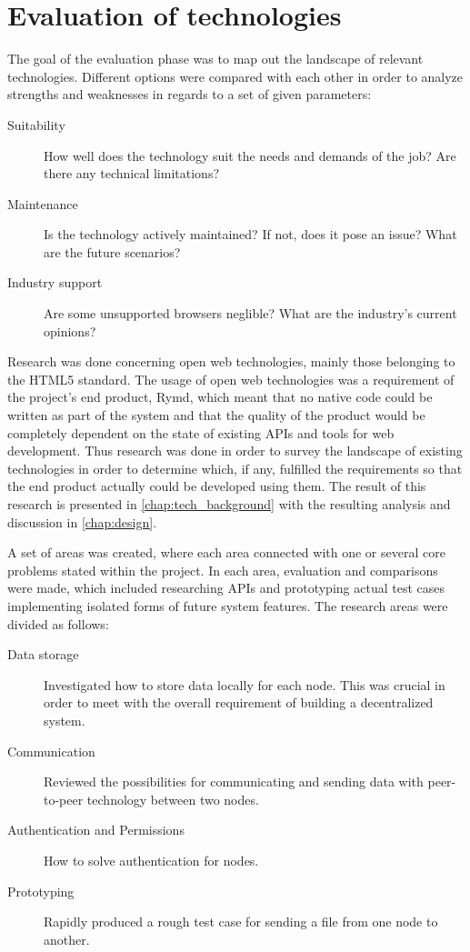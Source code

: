 \section{Evaluation of technologies}

The goal of the evaluation phase was to map out the landscape of relevant technologies. Different options were compared  with each other in order to analyze strengths and weaknesses in regards to a set of given parameters:

\begin{description}
  \item[Suitability] How well does the technology suit the needs and demands of the job? Are there any technical limitations?
  \item[Maintenance] Is the technology actively maintained? If not, does it pose an issue? What are the future scenarios?
  \item[Industry support] Are some unsupported browsers neglible? What are the industry's current opinions?
\end{description}

Research was done concerning open web technologies, mainly those belonging to the HTML5 standard. The usage of open web technologies was a requirement of the project's end product, Rymd, which meant that no native code could be written as part of the system and that the quality of the product would be completely dependent on the state of existing APIs and tools for web development. Thus research was done in order to survey the landscape of existing technologies in order to determine which, if any, fulfilled the requirements so that the end product actually could be developed using them. The result of this research is presented in \ref{chap:tech_background} with the resulting analysis and discussion in \ref{chap:design}.

A set of areas was created, where each area connected with one or several core problems stated within the project. In each area, evaluation and comparisons were made, which included researching APIs and prototyping actual test cases implementing isolated forms of future system features. The research areas were divided as follows:

\begin{description}
\item[Data storage] Investigated how to store data locally for each node. This was crucial in order to meet with the overall requirement of building a decentralized system.
\item[Communication] Reviewed the possibilities for communicating and sending data with peer-to-peer technology between two nodes.
\item[Authentication and Permissions] How to solve authentication for nodes.
\item[Prototyping] Rapidly produced a rough test case for sending a file from one node to another.
\end{description}


